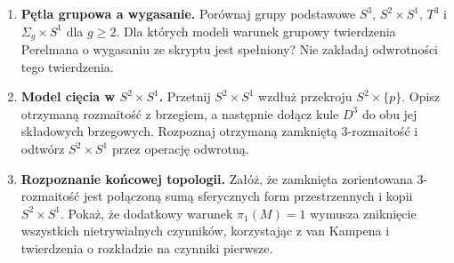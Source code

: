 \documentclass[11pt,a4paper,oneside,openany]{book}
\begin{document}
\begin{enumerate}
\item \textbf{Pętla grupowa a wygasanie.} Porównaj grupy podstawowe $S^3$, $S^2\times S^1$, $T^3$ i $\Sigma_g\times S^1$ dla $g\ge2$. Dla których modeli warunek grupowy twierdzenia Perelmana o wygasaniu ze skryptu jest spełniony? Nie zakładaj odwrotności tego twierdzenia.
\item \textbf{Model cięcia w $S^2\times S^1$.} Przetnij $S^2\times S^1$ wzdłuż przekroju $S^2\times\{p\}$. Opisz otrzymaną rozmaitość z brzegiem, a następnie dołącz kule $D^3$ do obu jej składowych brzegowych. Rozpoznaj otrzymaną zamkniętą $3$-rozmaitość i odtwórz $S^2\times S^1$ przez operację odwrotną.
\item \textbf{Rozpoznanie końcowej topologii.} Załóż, że zamknięta zorientowana $3$-rozmaitość jest połączoną sumą sferycznych form przestrzennych i kopii $S^2\times S^1$. Pokaż, że dodatkowy warunek $\pi_1(M)=1$ wymusza zniknięcie wszystkich nietrywialnych czynników, korzystając z van Kampena i twierdzenia o rozkładzie na czynniki pierwsze.
\end{enumerate}
\end{document}
